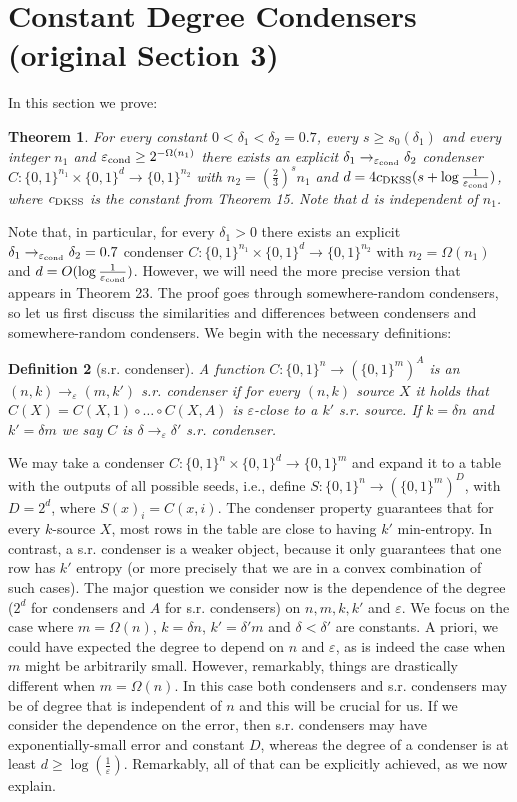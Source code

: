 \documentclass[10pt,a4paper]{article}
\newtheorem{theorem}{Theorem}
\newtheorem{definition}[theorem]{Definition}
\begin{document}
\section*{Constant Degree Condensers (original Section 3)}
In this section we prove:
\begin{theorem}
For every constant $0<\delta_1<\delta_2=0.7$, every $s\ge s_0(\delta_1)$ and every integer $n_1$ and $\varepsilon_{\rm cond}\ge2^{-\Omega(n_1)}$ there exists an explicit $\delta_1\to_{\varepsilon_{\rm cond}}\delta_2$ condenser $C:\{0,1\}^{n_1}\times\{0,1\}^d\to\{0,1\}^{n_2}$ with $n_2=(\frac23)^sn_1$ and $d=4c_{\rm DKSS}(s+\log\frac1{\varepsilon_{\rm cond}})$, where $c_{\rm DKSS}$ is the constant from Theorem 15. Note that $d$ is independent of $n_1$.
\end{theorem}
Note that, in particular, for every $\delta_1>0$ there exists an explicit $\delta_1\to_{\varepsilon_{\rm cond}}\delta_2=0.7$ condenser $C:\{0,1\}^{n_1}\times\{0,1\}^d\to\{0,1\}^{n_2}$ with $n_2=\Omega(n_1)$ and $d=O(\log\frac1{\varepsilon_{\rm cond}})$. However, we will need the more precise version that appears in Theorem 23.
The proof goes through somewhere-random condensers, so let us first discuss the similarities and differences between condensers and somewhere-random condensers. We begin with the necessary definitions:
\begin{definition}[s.r. condenser]
A function $C:\{0,1\}^n\to(\{0,1\}^m)^A$ is an $(n,k)\to_\varepsilon(m,k')$ s.r. condenser if for every $(n,k)$ source $X$ it holds that $C(X)=C(X,1)\circ\ldots\circ C(X,A)$ is $\varepsilon$-close to a $k'$ s.r. source. If $k=\delta n$ and $k'=\delta m$ we say $C$ is $\delta\to_\varepsilon\delta'$ s.r. condenser.
\end{definition}
We may take a condenser $C:\{0,1\}^n\times\{0,1\}^d\to\{0,1\}^m$ and expand it to a table with the outputs of all possible seeds, i.e., define $S:\{0,1\}^n\to(\{0,1\}^m)^D$, with $D=2^d$, where $S(x)_i=C(x,i)$. The condenser property guarantees that for every $k$-source $X$, most rows in the table are close to having $k'$ min-entropy. In contrast, a s.r. condenser is a weaker object, because it only guarantees that one row has $k'$ entropy (or more precisely that we are in a convex combination of such cases).
The major question we consider now is the dependence of the degree ($2^d$ for condensers and $A$ for s.r. condensers) on $n,m,k,k'$ and $\varepsilon$. We focus on the case where $m=\Omega(n)$, $k=\delta n$, $k'=\delta'm$ and $\delta<\delta'$ are constants. A priori, we could have expected the degree to depend on $n$ and $\varepsilon$, as is indeed the case when $m$ might be arbitrarily small. However, remarkably, things are drastically different when $m=\Omega(n)$. In this case both condensers and s.r. condensers may be of degree that is independent of $n$ and this will be crucial for us. If we consider the dependence on the error, then s.r. condensers may have exponentially-small error and constant $D$, whereas the degree of a condenser is at least $d\ge\log(\frac1\varepsilon)$. Remarkably, all of that can be explicitly achieved, as we now explain.
\end{document}
